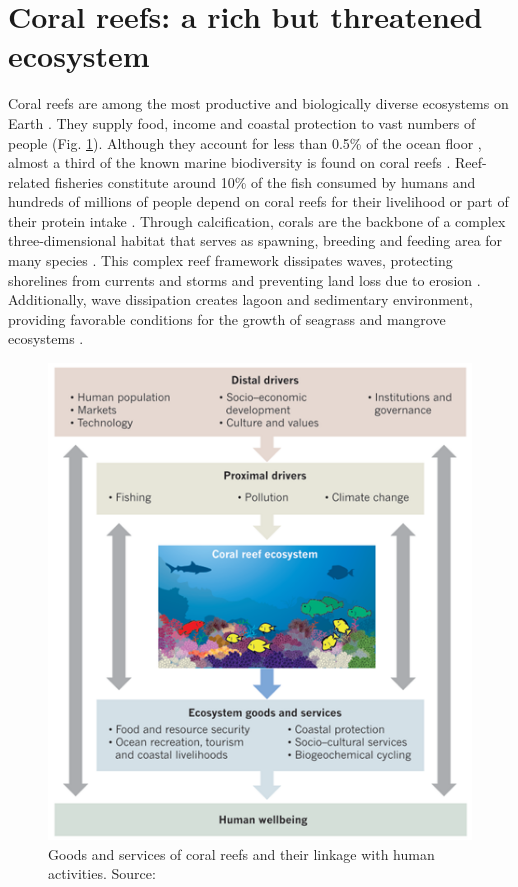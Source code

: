 \section{Coral reefs: a rich but threatened ecosystem}


Coral reefs are among the most productive and biologically diverse ecosystems on Earth \citep{connell1978diversity, moberg1999ecological}. They supply food, income and coastal protection to vast numbers of people (Fig. \ref{intro:corals}). Although they account for less than 0.5\% of the ocean floor \citep{spalding1997new}, almost a third of the known marine biodiversity is found on coral reefs \citep{moberg1999ecological}. Reef-related fisheries constitute around 10\% of the fish consumed by humans \citep{smith1978coral} and hundreds of millions of people depend on coral reefs for their livelihood or part of their protein intake \citep{salvat1992coral,hoegh2019people}. Through calcification, corals are the backbone of a complex three-dimensional habitat that serves as spawning, breeding and feeding area for many species \citep{moberg1999ecological}. This complex reef framework  dissipates waves, protecting shorelines from currents and storms and preventing land loss due to erosion \citep{ferrario2014effectiveness,elliff2017coral}. Additionally, wave dissipation creates lagoon and sedimentary environment, providing favorable conditions for the growth of seagrass and mangrove ecosystems \citep{moberg1999ecological}.

\begin{figure}
    \centering
    \includegraphics[width=.8\textwidth]{chapters/intro/figures/anthropocene.png}
    \caption{Goods and services of coral reefs and their linkage with human activities. Source: \cite{hughes2017coral}}
    \label{intro:corals}
\end{figure}

